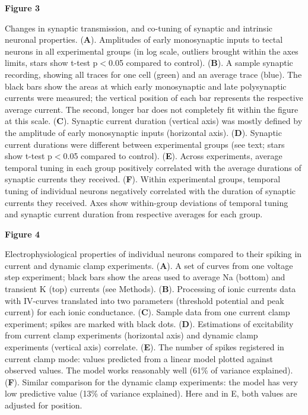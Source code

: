 \documentclass{article}
\begin{document}
\textbf{Figure 3}

Changes in synaptic transmission, and co-tuning of synaptic and intrinsic neuronal properties. (\textbf{A}). Amplitudes of early monosynaptic inputs to tectal neurons in all experimental groups (in log scale, outliers brought within the axes limits, stars show t-test p$<$0.05 compared to control). (\textbf{B}). A sample synaptic recording, showing all traces for one cell (green) and an average trace (blue). The black bars show the areas at which early monosynaptic and late polysynaptic currents were measured; the vertical position of each bar represents the respective average current. The second, longer bar does not completely fit within the figure at this scale. (\textbf{C}). Synaptic current duration (vertical axis) was mostly defined by the amplitude of early monosynaptic inputs (horizontal axis). (\textbf{D}). Synaptic current durations were different between experimental groups (see text; stars show t-test p$<$0.05 compared to control). (\textbf{E}). Across experiments, average temporal tuning in each group positively correlated with the average durations of synaptic currents they received. (\textbf{F}). Within experimental groups, temporal tuning of individual neurons negatively correlated with the duration of synaptic currents they received. Axes show within-group deviations of temporal tuning and synaptic current duration from respective averages for each group.

\textbf{Figure 4}

Electrophysiological properties of individual neurons compared to their spiking in current and dynamic clamp experiments. (\textbf{A}). A set of curves from one voltage step experiment; black bars show the areas used to average Na (bottom) and transient K (top) currents (see Methods). (\textbf{B}). Processing of ionic currents data with IV-curves translated into two parameters (threshold potential and peak current) for each ionic conductance. (\textbf{C}). Sample data from one current clamp experiment; spikes are marked with black dots. (\textbf{D}). Estimations of excitability from current clamp experiments (horizontal axis) and dynamic clamp experiments (vertical axis) correlate. (\textbf{E}). The number of spikes registered in current clamp mode: values predicted from a linear model plotted against observed values. The model works reasonably well (61\% of variance explained). (\textbf{F}). Similar comparison for the dynamic clamp experiments: the model has very low predictive value (13\% of variance explained). Here and in E, both values are adjusted for position.

\end{document}
